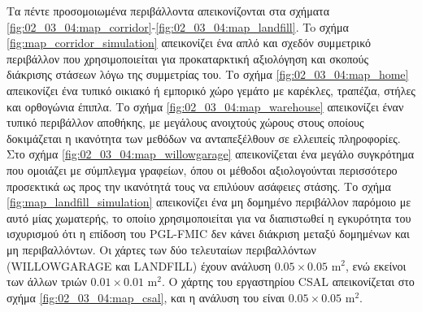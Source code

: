 Τα πέντε προσομοιωμένα περιβάλλοντα απεικονίζονται στα σχήματα
\ref{fig:02_03_04:map_corridor}-\ref{fig:02_03_04:map_landfill}. To σχήμα
\ref{fig:map_corridor_simulation} απεικονίζει ένα απλό και σχεδόν συμμετρικό
περιβάλλον που χρησιμοποιείται για προκαταρκτική αξιολόγηση και σκοπούς
διάκρισης στάσεων λόγω της συμμετρίας του. Το σχήμα \ref{fig:02_03_04:map_home}
απεικονίζει ένα τυπικό οικιακό ή εμπορικό χώρο γεμάτο με καρέκλες, τραπέζια,
στήλες και ορθογώνια έπιπλα. Το σχήμα \ref{fig:02_03_04:map_warehouse}
απεικονίζει έναν τυπικό περιβάλλον αποθήκης, με μεγάλους ανοιχτούς χώρους στους
οποίους δοκιμάζεται η ικανότητα των μεθόδων να ανταπεξέλθουν σε ελλειπείς
πληροφορίες. Στο σχήμα \ref{fig:02_03_04:map_willowgarage} απεικονίζεται ένα
μεγάλο συγκρότημα που ομοιάζει με σύμπλεγμα γραφείων, όπου οι μέθοδοι
αξιολογούνται περισσότερο προσεκτικά ως προς την ικανότητά τους να επιλύουν
ασάφειες στάσης. Το σχήμα \ref{fig:map_landfill_simulation} απεικονίζει ένα μη
δομημένο περιβάλλον παρόμοιο με αυτό μίας χωματερής, το οποίιο χρησιμοποιείται
για να διαπιστωθεί η εγκυρότητα του ισχυρισμού ότι η επίδοση του PGL-FMIC δεν
κάνει διάκριση μεταξύ δομημένων και μη περιβαλλόντων. Οι χάρτες των δύο
τελευταίων περιβαλλόντων (WILLOWGARAGE και LANDFILL) έχουν ανάλυση
$0.05\times0.05$ m$^2$, ενώ εκείνοι των άλλων τριών $0.01\times0.01$ m$^2$. Ο
χάρτης του εργαστηρίου CSAL απεικονίζεται στο σχήμα
\ref{fig:02_03_04:map_csal}, και η ανάλυση του είναι $0.05\times0.05$ m$^2$.

